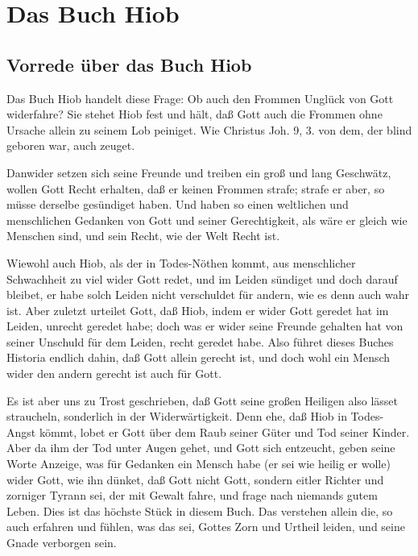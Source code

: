 
\part{Das Buch Hiob}

\chapter{Vorrede über das Buch Hiob}

Das Buch Hiob handelt diese Frage: Ob auch den Frommen Unglück von Gott widerfahre? Sie stehet Hiob fest und hält, daß Gott auch die Frommen ohne Ursache allein zu seinem Lob peiniget. Wie Christus Joh. 9, 3. von dem, der blind geboren war, auch zeuget.

Danwider setzen sich seine Freunde und treiben ein groß und lang Geschwätz, wollen Gott Recht erhalten, daß er keinen Frommen strafe; strafe er aber, so müsse derselbe gesündiget haben. Und haben so einen weltlichen und menschlichen Gedanken von Gott und seiner Gerechtigkeit, als wäre er gleich wie Menschen sind, und sein Recht, wie der Welt Recht ist.

Wiewohl auch Hiob, als der in Todes-Nöthen kommt, aus menschlicher Schwachheit zu viel wider Gott redet, und im Leiden sündiget und doch darauf bleibet, er habe solch Leiden nicht verschuldet für andern, wie es denn auch wahr ist. Aber zuletzt urteilet Gott, daß Hiob, indem er wider Gott geredet hat im Leiden, unrecht geredet habe; doch was er wider seine Freunde gehalten hat von seiner Unschuld für dem Leiden, recht geredet habe. Also führet dieses Buches Historia endlich dahin, daß Gott allein gerecht ist, und doch wohl ein Mensch wider den andern gerecht ist auch für Gott.

Es ist aber uns zu Trost geschrieben, daß Gott seine großen Heiligen also lässet straucheln, sonderlich in der Widerwärtigkeit. Denn ehe, daß Hiob in Todes-Angst kömmt, lobet er Gott über dem Raub seiner Güter und Tod seiner Kinder. Aber da ihm der Tod unter Augen gehet, und Gott sich entzeucht, geben seine Worte Anzeige, was für Gedanken ein Mensch habe (er sei wie heilig er wolle) wider Gott, wie ihn dünket, daß Gott nicht Gott, sondern eitler Richter und zorniger Tyrann sei, der mit Gewalt fahre, und frage nach niemands gutem Leben. Dies ist das höchste Stück in diesem Buch. Das verstehen allein die, so auch erfahren und fühlen, was das sei, Gottes Zorn und Urtheil leiden, und seine Gnade verborgen sein.

